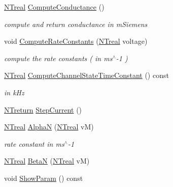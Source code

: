 \begin{DoxyCompactItemize}
\hyperlink{nt__types_8h_a814a97893e9deb1eedcc7604529ba80d}{NTreal} \hyperlink{class_n_t_b_p__colbert__axonal__potassium__multi__current__o_a1a18f430a42d81b913c8f6ff109e3569}{ComputeConductance} ()
\begin{DoxyCompactList}\small\item\em compute and return conductance in mSiemens \item\end{DoxyCompactList}\item 
void \hyperlink{class_n_t_b_p__colbert__axonal__potassium__multi__current__o_a6e78ab914f437a41a2877f2a84af79a4}{ComputeRateConstants} (\hyperlink{nt__types_8h_a814a97893e9deb1eedcc7604529ba80d}{NTreal} voltage)
\begin{DoxyCompactList}\small\item\em compute the rate constants ( in ms$^\wedge$-\/1 ) \item\end{DoxyCompactList}\item 
\hyperlink{nt__types_8h_a814a97893e9deb1eedcc7604529ba80d}{NTreal} \hyperlink{class_n_t_b_p__colbert__axonal__potassium__multi__current__o_acc1a5378e52c5514f9f1e6ea0897045f}{ComputeChannelStateTimeConstant} () const 
\begin{DoxyCompactList}\small\item\em in kHz \item\end{DoxyCompactList}\item 
\hyperlink{nt__types_8h_ab9564ee8f091e809d21b8451c6683c53}{NTreturn} \hyperlink{class_n_t_b_p__colbert__axonal__potassium__multi__current__o_a9e4aa2ec2fb7d75973ebf42f29409cf9}{StepCurrent} ()
\item 
\hyperlink{nt__types_8h_a814a97893e9deb1eedcc7604529ba80d}{NTreal} \hyperlink{class_n_t_b_p__colbert__axonal__potassium__multi__current__o_a0f85a5b49bdc8fc24d3f4f59aceb3d52}{AlphaN} (\hyperlink{nt__types_8h_a814a97893e9deb1eedcc7604529ba80d}{NTreal} vM)
\begin{DoxyCompactList}\small\item\em rate constant in ms$^\wedge$-\/1 \item\end{DoxyCompactList}\item 
\hyperlink{nt__types_8h_a814a97893e9deb1eedcc7604529ba80d}{NTreal} \hyperlink{class_n_t_b_p__colbert__axonal__potassium__multi__current__o_af19d27f4eebee3a4bbbe3b2f4987b431}{BetaN} (\hyperlink{nt__types_8h_a814a97893e9deb1eedcc7604529ba80d}{NTreal} vM)
\item 
void \hyperlink{class_n_t_b_p__colbert__axonal__potassium__multi__current__o_ad35a2ec5f61c77428d94dbb5e00f92c6}{ShowParam} () const 
\end{DoxyCompactItemize}


